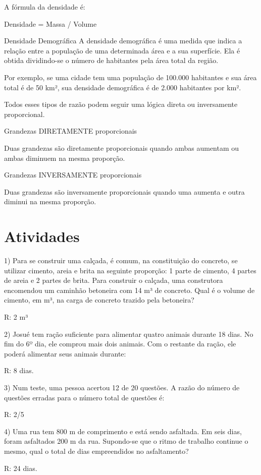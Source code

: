 A fórmula da densidade é:

Densidade = Massa / Volume

Densidade Demográfica A densidade demográfica é uma medida que indica a
relação entre a população de uma determinada área e a sua superfície.
Ela é obtida dividindo-se o número de habitantes pela área total da
região.

Por exemplo, se uma cidade tem uma população de 100.000 habitantes e sua
área total é de 50 km², sua densidade demográfica é de 2.000 habitantes
por km².

Todos esses tipos de razão podem seguir uma lógica direta ou
inversamente proporcional.

Grandezas DIRETAMENTE proporcionais

Duas grandezas são diretamente proporcionais quando ambas aumentam ou
ambas diminuem na mesma proporção.

Grandezas INVERSAMENTE proporcionais

Duas grandezas são inversamente proporcionais quando uma aumenta e outra
diminui na mesma proporção.

\section{Atividades}

1) Para se construir uma calçada, é comum, na constituição do concreto,
se utilizar cimento, areia e brita na seguinte proporção: 1 parte de
cimento, 4 partes de areia e 2 partes de brita. Para construir o
calçada, uma construtora encomendou um caminhão betoneira com 14 m³ de
concreto. Qual é o volume de cimento, em m³, na carga de concreto
trazido pela betoneira?

R: 2 m³

2) Josué tem ração suficiente para alimentar quatro animais durante 18
dias. No fim do 6º dia, ele comprou mais dois animais. Com o restante da
ração, ele poderá alimentar seus animais durante:

R: 8 dias.

3) Num teste, uma pessoa acertou 12 de 20 questões. A razão do número de
questões erradas para o número total de questões é:

R: 2/5

4) Uma rua tem 800 m de comprimento e está sendo asfaltada. Em seis
dias, foram asfaltados 200 m da rua. Supondo-se que o ritmo de trabalho
continue o mesmo, qual o total de dias empreendidos no asfaltamento?

R: 24 dias.

